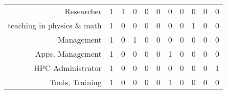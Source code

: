 {\begin{landscape}
\begin{longtable}[htb]{r|c|c|c|c|c|c|c|c|c|c}
{Researcher} & 1 & 1 & 0 & 0 & 0 & 0 & 0 & 0 & 0 & 0 \\%
{teaching in physics \& math} & 1 & 0 & 0 & 0 & 0 & 0 & 0 & 1 & 0 & 0 \\%
{Management} & 1 & 0 & 1 & 0 & 0 & 0 & 0 & 0 & 0 & 0 \\%
{Apps, Management} & 1 & 0 & 0 & 0 & 0 & 1 & 0 & 0 & 0 & 0 \\%
{HPC Administrator} & 1 & 0 & 0 & 0 & 0 & 0 & 0 & 0 & 0 & 1 \\%
{Tools, Training} & 1 & 0 & 0 & 0 & 0 & 1 & 0 & 0 & 0 & 0 \\%
\hline%
\end{longtable}%
\end{landscape}}%
\clearpage%
